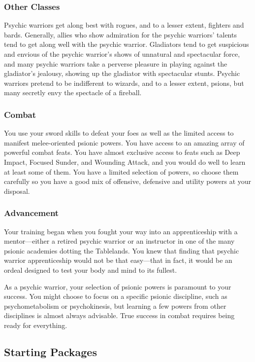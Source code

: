 \subsubsection{Other Classes}
Psychic warriors get along best with rogues, and to a lesser extent, fighters and bards. Generally, allies who show admiration for the psychic warriors' talents tend to get along well with the psychic warrior. Gladiators tend to get suspicious and envious of the psychic warrior's shows of unnatural and spectacular force, and many psychic warriors take a perverse pleasure in playing against the gladiator's jealousy, showing up the gladiator with spectacular stunts. Psychic warriors pretend to be indifferent to wizards, and to a lesser extent, psions, but many secretly envy the spectacle of a fireball.

\subsubsection{Combat}
You use your sword skills to defeat your foes as well as the limited access to manifest melee-oriented psionic powers. You have access to an amazing array of powerful combat feats. You have almost exclusive access to feats such as Deep Impact, Focused Sunder, and Wounding Attack, and you would do well to learn at least some of them. You have a limited selection of powers, so choose them carefully so you have a good mix of offensive, defensive and utility powers at your disposal.

\subsubsection{Advancement}
Your training began when you fought your way into an apprenticeship with a mentor---either a retired psychic warrior or an instructor in one of the many psionic academies dotting the Tablelands. You knew that finding that psychic warrior apprenticeship would not be that easy---that in fact, it would be an ordeal designed to test your body and mind to its fullest.

As a psychic warrior, your selection of psionic powers is paramount to your success. You might choose to focus on a specific psionic discipline, such as psychometabolism or psychokinesis, but learning a few powers from other disciplines is almost always advisable. True success in combat requires being ready for everything.

\vskip4cm
\subsection{Starting Packages}
